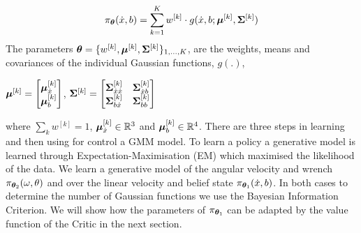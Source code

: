 \begin{equation}
 \pi_{\boldsymbol{\theta}}(\dot{x},b) = \sum\limits_{k=1}^{K} w^{[k]}	    \cdot  g(\dot{x},b;\boldsymbol{\mu}^{[k]},\boldsymbol{\Sigma}^{[k]}) \label{eq:GMM}
\end{equation}
The parameters $\boldsymbol{\theta} = \{w^{[k]},\boldsymbol{\mu}^{[k]},\boldsymbol{\Sigma}^{[k]}\}_{1,\dots,K}$, are the weights, means and covariances 
of the individual Gaussian functions, $g(.)$,
\begin{center}
$\boldsymbol{\mu}^{[k]} =  \begin{bmatrix} \boldsymbol{\mu}^{[k]}_{\dot{x}} \\ \boldsymbol{\mu}^{[k]}_{b} \end{bmatrix}$, 
$\boldsymbol{\Sigma}^{[k]} =  \begin{bmatrix} 
	  \boldsymbol{\Sigma}^{[k]}_{\dot{x}\dot{x}} & \boldsymbol{\Sigma}^{[k]}_{\dot{x}b} \\
	  \boldsymbol{\Sigma}^{[k]}_{b\dot{x}} & \boldsymbol{\Sigma}^{[k]}_{bb}
	  \end{bmatrix}$
\end{center}
where $\sum_{k} w^{[k]} = 1$, $\boldsymbol{\mu}^{[k]}_{\dot{x}} \in \mathbb{R}^{3}$ and  $\boldsymbol{\mu}^{[k]}_{b} \in \mathbb{R}^{4}$.
There are three steps in learning and then using for control a GMM model.  To learn a policy 
a generative model is learned through Expectation-Maximisation (EM) which maximised the likelihood
of the data. We learn a generative model of the angular velocity and wrench $\pi_{\boldsymbol{\theta}_2}(\omega,\theta)$
and over the linear velocity and belief state $\pi_{\boldsymbol{\theta}_1}(\dot{x},b)$. In both cases to determine the number 
of Gaussian functions we use the Bayesian Information Criterion. We will show how the parameters of $\pi_{\boldsymbol{\theta}_1}$
can be adapted by the value function of the Critic in the next section.



